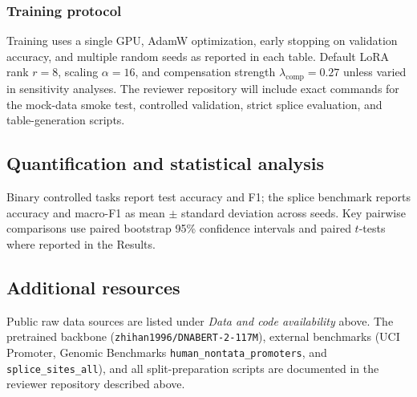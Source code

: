 \documentclass[12pt,letterpaper]{article}
\begin{document}
\subsubsection*{Training protocol}
Training uses a single GPU, AdamW optimization, early stopping on validation accuracy, and multiple random seeds as reported in each table. Default LoRA rank $r=8$, scaling $\alpha=16$, and compensation strength $\lambda_{\mathrm{comp}}=0.27$ unless varied in sensitivity analyses. The reviewer repository will include exact commands for the mock-data smoke test, controlled validation, strict splice evaluation, and table-generation scripts.

\subsection*{Quantification and statistical analysis}
Binary controlled tasks report test accuracy and F1; the splice benchmark reports accuracy and macro-F1 as mean $\pm$ standard deviation across seeds. Key pairwise comparisons use paired bootstrap 95\% confidence intervals and paired $t$-tests where reported in the Results.

\subsection*{Additional resources}
Public raw data sources are listed under \emph{Data and code availability} above. The pretrained backbone (\texttt{zhihan1996/DNABERT-2-117M}), external benchmarks (UCI Promoter, Genomic Benchmarks \texttt{human\_nontata\_promoters}, and \texttt{splice\_sites\_all}), and all split-preparation scripts are documented in the reviewer repository described above.
\end{document}
